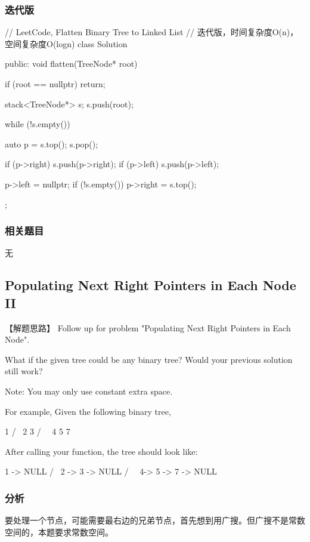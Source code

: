 \subsubsection{迭代版}
\begin{Code}
	// LeetCode, Flatten Binary Tree to Linked List
	// 迭代版，时间复杂度O(n)，空间复杂度O(logn)
	class Solution {
		public:
		void flatten(TreeNode* root) {
			if (root == nullptr) return;
			
			stack<TreeNode*> s;
			s.push(root);
			
			while (!s.empty()) {
				auto p = s.top();
				s.pop();
				
				if (p->right)
				s.push(p->right);
				if (p->left)
				s.push(p->left);
				
				p->left = nullptr;
				if (!s.empty())
				p->right = s.top();
			}
		}
	};
\end{Code}


\subsubsection{相关题目}
\begindot
\item 无
\myenddot


\subsection{Populating Next Right Pointers in Each Node II} %
\label{sec:populating-next-right-pointers-in-each-node-ii}


【解题思路】
Follow up for problem "Populating Next Right Pointers in Each Node".

What if the given tree could be any binary tree? Would your previous solution still work?

Note: You may only use constant extra space.

For example,
Given the following binary tree,
\begin{Code}
	1
	/  \
	2    3
	/ \    \
	4   5    7
\end{Code}

After calling your function, the tree should look like:
\begin{Code}
	1 -> NULL
	/  \
	2 -> 3 -> NULL
	/ \    \
	4-> 5 -> 7 -> NULL
\end{Code}


\subsubsection{分析}
要处理一个节点，可能需要最右边的兄弟节点，首先想到用广搜。但广搜不是常数空间的，本题要求常数空间。

